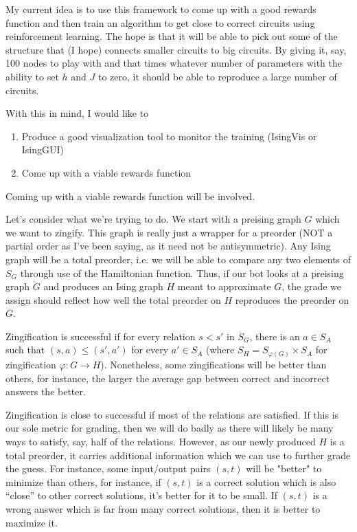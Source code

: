  My current idea is to use this framework to come up with a good rewards function and then train an algorithm to get close to correct circuits using reinforcement learning. The hope is that it will be able to pick out some of the structure that (I hope) connects smaller circuits to big circuits. By giving it, say, 100 nodes to play with and that times whatever number of parameters with the ability to set $h$ and $J$ to zero, it should be able to reproduce a large number of circuits.

With this in mind, I would like to 
\begin{enumerate}[(1)]
	\item Produce a good visualization tool to monitor the training (IsingVis or IsingGUI)
	\item Come up with a viable rewards function
\end{enumerate}


Coming up with a viable rewards function will be involved.

Let's consider what we're trying to do. We start with a preising graph $G$ which we want to zingify. This graph is really just a wrapper for a preorder (NOT a partial order as I've been saying, as it need not be antisymmetric). Any Ising graph will be a total preorder, i.e. we will be able to compare any two elements of $S_G$ through use of the Hamiltonian function. Thus, if our bot looks at a preising graph $G$ and produces an Ising graph $H$ meant to approximate $G$, the grade we assign should reflect how well the total preorder on $H$ reproduces the preorder on $G$.

Zingification is successful if for every relation $s < s'$ in $S_G$, there is an $a \in S_A$ such that $(s,a) \leq (s',a')$ for every $a' \in S_A$ (where $S_H = S_{\varphi(G)}\times S_A$ for zingification $\varphi:G \to H$). Nonetheless, some zingifications will be better than others, for instance, the larger the average gap between correct and incorrect answers the better.

Zingification is close to successful if most of the relations are satisfied. If this is our sole metric for grading, then we will do badly as there will likely be many ways to satisfy, say, half of the relations. However, as our newly produced $H$ is a total preorder, it carries additional information which we can use to further grade the guess. For instance, some input/output pairs $(s,t)$ will be "better" to minimize than others, for instance, if $(s,t)$ is a correct solution which is also ``close'' to other correct solutions, it's better for it to be small. If $(s,t)$ is a wrong answer which is far from many correct solutions, then it is better to maximize it.

